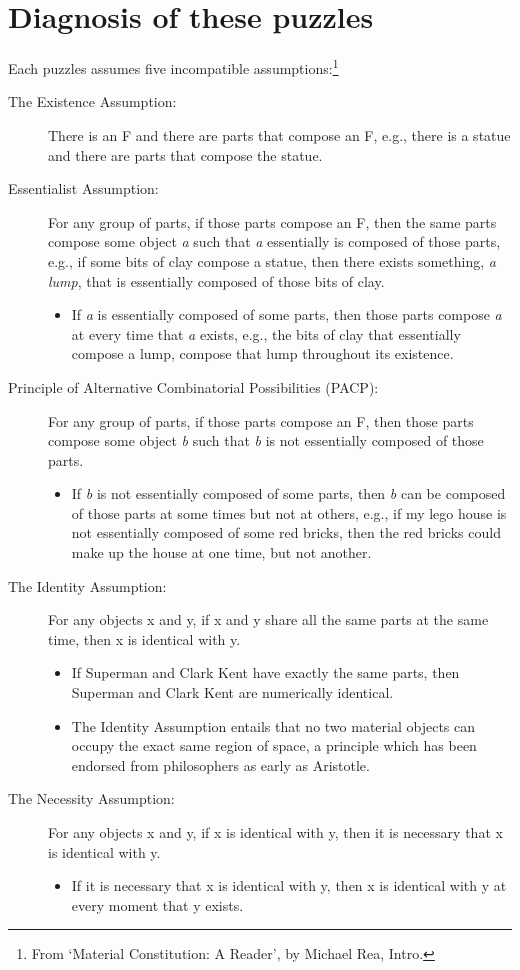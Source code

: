 \documentclass[9pt]{article}
\begin{document}
\section{Diagnosis of these puzzles}

Each puzzles assumes five incompatible assumptions:\footnote{From `Material  Constitution: A  Reader',  by Michael Rea, Intro.}
\begin{description}
\item [The Existence Assumption:] There is an F and there are parts that compose an F, e.g., there is a statue and there are parts that compose the statue. 
\item [Essentialist Assumption:] For any group of parts, if those parts compose an F, then the same parts compose some object \emph{a} such that \emph{a} essentially is composed of those parts, e.g., if some bits of clay compose a statue, then there exists something, \emph{a lump}, that is essentially composed of those bits of clay. 
\begin{itemize}
\item If \emph{a} is essentially composed of some parts, then those parts compose \emph{a} at every time that \emph{a} exists, e.g., the bits of clay that essentially compose a lump, compose that lump throughout its existence. 
\end{itemize}
\item [Principle of Alternative Combinatorial Possibilities (PACP):] For any group of parts, if those parts compose an F, then those parts compose some object \emph{b} such that  \emph{b} is not essentially composed of those parts.
\begin{itemize}
\item If \emph{b} is not essentially composed of some parts, then \emph{b} can be composed of  those parts at some times but not at others, e.g., if my lego house is not essentially composed of some red bricks, then the red bricks could make up the house at one time, but not another. 
\end{itemize}
\item [The Identity Assumption:] For any objects x  and y, if x and y  share all the same parts at the same time, then x is identical with y. 
\begin{itemize}
\item If Superman and Clark Kent have exactly the same parts,  then Superman and Clark Kent are numerically identical. 
\item The Identity Assumption entails that no two material objects can occupy the exact same region of space, a principle which has been endorsed from philosophers as early as Aristotle. 
\end{itemize}

\item[The Necessity Assumption:] For any objects x  and y, if x is identical with y, then it is necessary that x is identical with y.
\begin{itemize}
\item If it is necessary that x is identical with y, then x is identical with y at every moment that y exists. 
\end{itemize}
\end{description}
\end{document}
